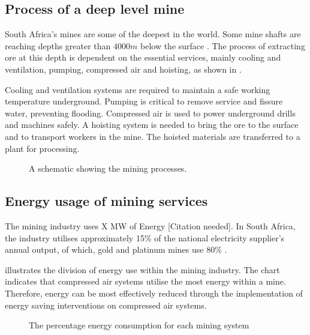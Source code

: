 	\subsection{Process of a deep level mine}
	South Africa's mines are some of the deepest in the world. Some mine shafts are reaching depths greater than $4000m$ below the surface \cite{vosloo2012case}. The process of extracting ore at this depth is dependent on the essential services, mainly cooling and ventilation, pumping, compressed air and hoisting, as shown in .
	\par 
	 Cooling and ventilation systems are required to maintain a safe working temperature underground. Pumping is critical to remove service and fissure water, preventing flooding. Compressed air is used to power underground drills and machines safely. A hoisting system is needed to bring the ore to the surface and to transport workers in the mine. The hoisted materials are transferred to a plant for processing.  
		\begin{figure}[h!]
			\centering
			\caption{A schematic showing the mining processes.}
			\label{fig: Mining Layout}
		\end{figure}
		\subsection{Energy usage of mining services}
			The mining industry uses X MW of Energy [Citation needed]. In South Africa, the industry utilises approximately 15\% of the national electricity supplier's annual output, of which, gold and platinum mines use 80\% \cite{Eskom2010Energy}.
			\par
			  illustrates the division of energy use within the mining industry. The chart indicates that compressed air systems utilise the most energy within a mine. Therefore, energy can be most effectively reduced through the implementation of energy saving interventions on compressed air systems.
			\begin{figure}[h]
				\centering
				\fbox{}
				\caption[The percentagee energy consumption for each mining system]{The percentage energy consumption for each mining system \cite{le2005energy}}
				\label{fig: Energy Split}
			\end{figure}
